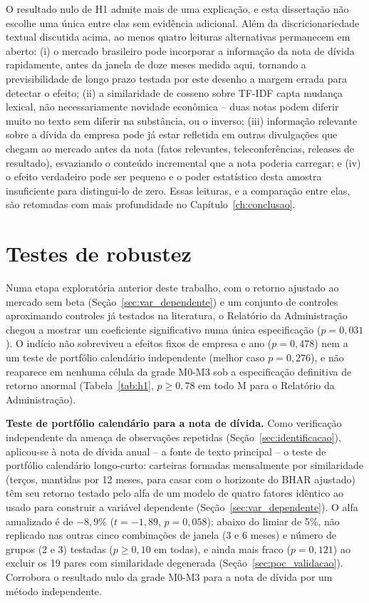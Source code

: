 \documentclass[a4paper,12pt]{report}
\begin{document}
O resultado nulo de H1 admite mais de uma explicação, e esta dissertação não escolhe uma única entre elas sem evidência adicional. Além da discricionariedade textual discutida acima, ao menos quatro leituras alternativas permanecem em aberto: (i) o mercado brasileiro pode incorporar a informação da nota de dívida rapidamente, antes da janela de doze meses medida aqui, tornando a previsibilidade de longo prazo testada por este desenho a margem errada para detectar o efeito; (ii) a similaridade de cosseno sobre TF-IDF capta mudança lexical, não necessariamente novidade econômica -- duas notas podem diferir muito no texto sem diferir na substância, ou o inverso; (iii) informação relevante sobre a dívida da empresa pode já estar refletida em outras divulgações que chegam ao mercado antes da nota (fatos relevantes, teleconferências, releases de resultado), esvaziando o conteúdo incremental que a nota poderia carregar; e (iv) o efeito verdadeiro pode ser pequeno e o poder estatístico desta amostra insuficiente para distingui-lo de zero. Essas leituras, e a comparação entre elas, são retomadas com mais profundidade no Capítulo~\ref{ch:conclusao}.

\section{Testes de robustez}
\label{sec:robustez}

Numa etapa exploratória anterior deste trabalho, com o retorno ajustado ao mercado sem beta (Seção~\ref{sec:var_dependente}) e um conjunto de controles aproximando controles já testados na literatura, o Relatório da Administração chegou a mostrar um coeficiente significativo numa única especificação ($p=0{,}031$). O indício não sobreviveu a efeitos fixos de empresa e ano ($p=0{,}478$) nem a um teste de portfólio calendário independente (melhor caso $p=0{,}276$), e não reaparece em nenhuma célula da grade M0-M3 sob a especificação definitiva de retorno anormal (Tabela~\ref{tab:h1}, $p \geq 0{,}78$ em todo M para o Relatório da Administração).

\textbf{Teste de portfólio calendário para a nota de dívida.} Como verificação independente da ameaça de observações repetidas (Seção~\ref{sec:identificacao}), aplicou-se à nota de dívida anual -- a fonte de texto principal -- o teste de portfólio calendário longo-curto: carteiras formadas mensalmente por similaridade (terços, mantidas por 12 meses, para casar com o horizonte do BHAR ajustado) têm seu retorno testado pelo alfa de um modelo de quatro fatores idêntico ao usado para construir a variável dependente (Seção~\ref{sec:var_dependente}). O alfa anualizado é de $-8{,}9\%$ ($t=-1{,}89$, $p=0{,}058$): abaixo do limiar de 5\%, não replicado nas outras cinco combinações de janela (3 e 6 meses) e número de grupos (2 e 3) testadas ($p \geq 0{,}10$ em todas), e ainda mais fraco ($p=0{,}121$) ao excluir os 19 pares com similaridade degenerada (Seção~\ref{sec:poc_validacao}). Corrobora o resultado nulo da grade M0-M3 para a nota de dívida por um método independente.
\end{document}
